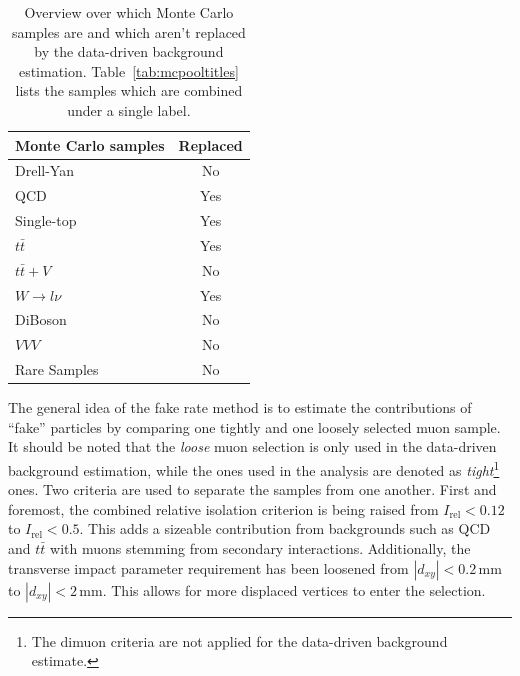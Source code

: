 \begin{table}[!htb]
  \centering
  \begin{tabular}{|l|c|}
\hline
Monte Carlo samples & Replaced \\
\hline
Drell-Yan & No \\
QCD & Yes \\
Single-top & Yes \\
$t \bar{t}$ & Yes \\
$t \bar{t} + V$ & No \\
$W \rightarrow l \nu$ & Yes \\
DiBoson & No \\
$VVV$ & No \\
Rare Samples & No \\
\hline
  \end{tabular}
  \caption{Overview over which Monte Carlo samples are and which aren't replaced by the data-driven background estimation. Table~\ref{tab:mcpooltitles} lists the samples which are combined under a single label.}
  \label{tab:fakerate-mc-overview}
\end{table}

The general idea of the fake rate method is to estimate the contributions of ``fake'' particles by comparing one tightly and one loosely selected muon sample. It should be noted that the \textit{loose} muon selection is only used in the data-driven background estimation, while the ones used in the analysis are denoted as \textit{tight}\footnote{The dimuon criteria are not applied for the data-driven background estimate.} ones. Two criteria are used to separate the samples from one another. First and foremost, the combined relative isolation criterion is being raised from $I_{\text{rel}} < 0.12$ to $I_{\text{rel}} < 0.5$. This adds a sizeable contribution from backgrounds such as QCD and $t \bar{t}$ with muons stemming from secondary interactions. Additionally, the transverse impact parameter requirement has been loosened from $|d_{xy}| < 0.2\,\text{mm}$ to $|d_{xy}| < 2\,\text{mm}$. This allows for more displaced vertices to enter the selection.

